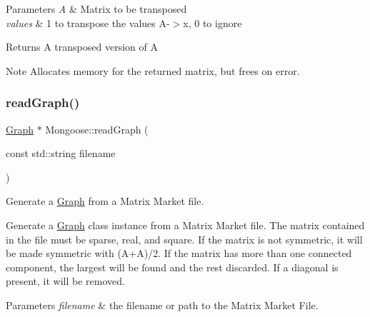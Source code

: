 \begin{DoxyParams}{Parameters}
{\em A} & Matrix to be transposed \\
\hline
{\em values} & 1 to transpose the values A-\/$>$x, 0 to ignore \\
\hline
\end{DoxyParams}
\begin{DoxyReturn}{Returns}
A transposed version of A 
\end{DoxyReturn}
\begin{DoxyNote}{Note}
Allocates memory for the returned matrix, but frees on error. 
\end{DoxyNote}
\hypertarget{namespace_mongoose_a6dba86117ea57ef9d093db03e0e9a08d}{}\label{namespace_mongoose_a6dba86117ea57ef9d093db03e0e9a08d} 
\subsubsection{\texorpdfstring{read\+Graph()}{readGraph()}\hspace{0.1cm}{\footnotesize\ttfamily [1/2]}}
{\footnotesize\ttfamily \hyperlink{class_mongoose_1_1_graph}{Graph} $\ast$ Mongoose\+::read\+Graph (\begin{DoxyParamCaption}\item[{const std\+::string}]{filename }\end{DoxyParamCaption})}



Generate a \hyperlink{class_mongoose_1_1_graph}{Graph} from a Matrix Market file. 

Generate a \hyperlink{class_mongoose_1_1_graph}{Graph} class instance from a Matrix Market file. The matrix contained in the file must be sparse, real, and square. If the matrix is not symmetric, it will be made symmetric with (A+A\textquotesingle{})/2. If the matrix has more than one connected component, the largest will be found and the rest discarded. If a diagonal is present, it will be removed.


\begin{DoxyParams}{Parameters}
{\em filename} & the filename or path to the Matrix Market File. \\
\hline
\end{DoxyParams}
\hypertarget{namespace_mongoose_a13ce6efb0d1b7dc6420eeda564b03511}{}\label{namespace_mongoose_a13ce6efb0d1b7dc6420eeda564b03511} 
